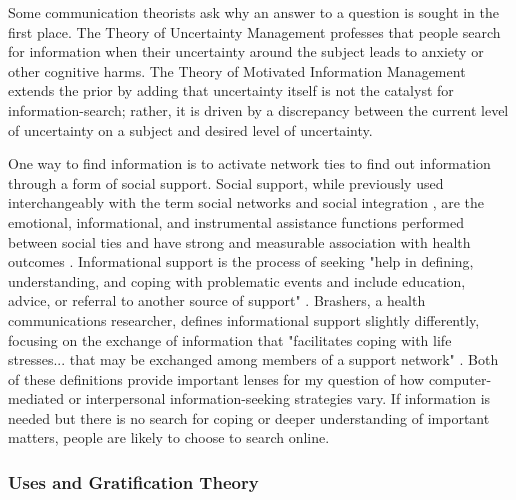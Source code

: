 Some communication theorists ask why an answer to a question is sought
in the first place. The Theory of Uncertainty Management \citep{brashersCommunicationUncertaintyManagement2001}
professes that people search for information when their uncertainty
around the subject leads to anxiety or other cognitive harms. The Theory
of Motivated Information Management \citep{afifiSeekingInformationSexual2006, afifiTheoryMotivatedInformation2004}
extends the prior by adding that uncertainty itself is not the catalyst
for information-search; rather, it is driven by a discrepancy between
the current level of uncertainty on a subject and desired level of
uncertainty.

One way to find information is to activate network ties to find out
information through a form of social support. Social support, while
previously used interchangeably with the term social networks and social
integration \citep{houseStructuresProcessesSocial1988}, are the emotional,
informational, and instrumental assistance functions performed between
social ties and have strong and measurable association with health
outcomes \citep{houseMeasuresConceptsSocial1985, thoitsMechanismsLinkingSocial2011}. Informational support is
the process of seeking "help in defining, understanding, and coping with
problematic events and include education, advice, or referral to another
source of support" \citep[p. 640]{winemiller_etal93}. Brashers, a health
communications researcher, defines informational support slightly
differently, focusing on the exchange of information that "facilitates
coping with life stresses... that may be exchanged among members of a
support network" \citeyearpar[p. 260]{brashersInformationSeekingAvoiding2002}.
Both of these definitions provide important
lenses for my question of how computer-mediated or interpersonal
information-seeking strategies vary. If information is needed but there
is no search for coping or deeper understanding of important matters,
people are likely to choose to search online.

\subsubsection{Uses and Gratification Theory}

